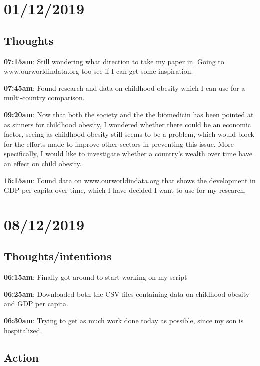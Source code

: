 \documentclass{article}
\begin{document}
\section{01/12/2019}
\subsection{Thoughts}
\textbf{07:15am}: Still wondering what direction to take my paper in. Going to www.ourworldindata.org too see if I can get some inspiration.

\textbf{07:45am}: Found research and data on childhood obesity which I can use for a multi-country comparison.

\textbf{09:20am}: Now that both the society and the the biomedicin has been pointed at as sinners for childhood obesity, I wondered whether there could be an economic factor, seeing as childhood obesity still seems to be a problem, which would block for the efforts made to improve other sectors in preventing this issue. More specifically, I would like to investigate whether a country's wealth over time have an effect on child obesity.

\textbf{15:15am}: Found data on www.ourworldindata.org that shows the development in GDP per capita over time, which I have decided I want to use for my research.


\section{08/12/2019}
\subsection{Thoughts/intentions}
\textbf{06:15am}: Finally got around to start working on my script

\textbf{06:25am}: Downloaded both the CSV files containing data on childhood obesity and GDP per capita.

\textbf{06:30am}: Trying to get as much work done today as possible, since my son is hospitalized.

\subsection{Action}
\end{document}
